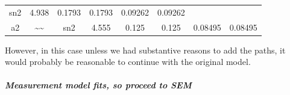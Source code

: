 \documentclass[]{article}
\let\oldsubparagraph\subparagraph
\renewcommand{\subparagraph}[1]{\oldsubparagraph{#1}\mbox{}}
\theoremstyle{definition}
\theoremstyle{definition}
\theoremstyle{definition}
\theoremstyle{remark}
\begin{document}
\begin{longtable}[]{@{}cccccccc@{}}
\begin{minipage}[t]{0.07\columnwidth}
sn2\strut
\end{minipage} & \begin{minipage}[t]{0.09\columnwidth}\centering\strut
4.938\strut
\end{minipage} & \begin{minipage}[t]{0.11\columnwidth}\centering\strut
0.1793\strut
\end{minipage} & \begin{minipage}[t]{0.11\columnwidth}\centering\strut
0.1793\strut
\end{minipage} & \begin{minipage}[t]{0.12\columnwidth}\centering\strut
0.09262\strut
\end{minipage} & \begin{minipage}[t]{0.12\columnwidth}\centering\strut
0.09262\strut
\end{minipage}\tabularnewline
\begin{minipage}[t]{0.07\columnwidth}\centering\strut
a2\strut
\end{minipage} & \begin{minipage}[t]{0.05\columnwidth}\centering\strut
\textasciitilde{}\textasciitilde{}\strut
\end{minipage} & \begin{minipage}[t]{0.07\columnwidth}\centering\strut
sn2\strut
\end{minipage} & \begin{minipage}[t]{0.09\columnwidth}\centering\strut
4.555\strut
\end{minipage} & \begin{minipage}[t]{0.11\columnwidth}\centering\strut
0.125\strut
\end{minipage} & \begin{minipage}[t]{0.11\columnwidth}\centering\strut
0.125\strut
\end{minipage} & \begin{minipage}[t]{0.12\columnwidth}\centering\strut
0.08495\strut
\end{minipage} & \begin{minipage}[t]{0.12\columnwidth}\centering\strut
0.08495\strut
\end{minipage}\tabularnewline
\bottomrule
\end{longtable}

However, in this case unless we had substantive reasons to add the
paths, it would probably be reasonable to continue with the original
model.

\subparagraph{Measurement model fits, so proceed to
SEM}\label{measurement-model-fits-so-proceed-to-sem}
\end{document}
